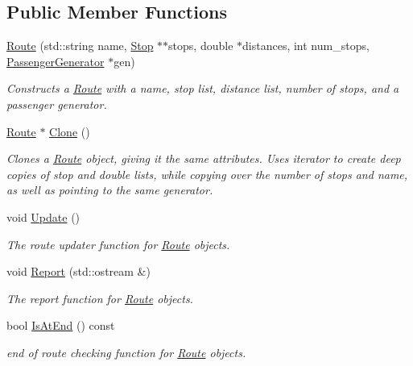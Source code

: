 \subsection*{Public Member Functions}
\begin{DoxyCompactItemize}
\item 
\hyperlink{classRoute_ad1bef6c95f3ca3c2713fba850eee9057}{Route} (std\+::string name, \hyperlink{classStop}{Stop} $\ast$$\ast$stops, double $\ast$distances, int num\+\_\+stops, \hyperlink{classPassengerGenerator}{Passenger\+Generator} $\ast$gen)
\begin{DoxyCompactList}\small\item\em Constructs a \hyperlink{classRoute}{Route} with a name, stop list, distance list, number of stops, and a passenger generator. \end{DoxyCompactList}\item 
\hyperlink{classRoute}{Route} $\ast$ \hyperlink{classRoute_a4031b4a218b1530e28dcf5ee5c6fa8e7}{Clone} ()
\begin{DoxyCompactList}\small\item\em Clones a \hyperlink{classRoute}{Route} object, giving it the same attributes. Uses iterator to create deep copies of stop and double lists, while copying over the number of stops and name, as well as pointing to the same generator. \end{DoxyCompactList}\item 
void \hyperlink{classRoute_a7ecf1d4200f5fe110de4a1d9ea9408c3}{Update} ()
\begin{DoxyCompactList}\small\item\em The route updater function for \hyperlink{classRoute}{Route} objects. \end{DoxyCompactList}\item 
void \hyperlink{classRoute_a6115a741ea15af716c1a624627ec954a}{Report} (std\+::ostream \&)
\begin{DoxyCompactList}\small\item\em The report function for \hyperlink{classRoute}{Route} objects. \end{DoxyCompactList}\item 
bool \hyperlink{classRoute_a529ab995aefd1001b250a6c1ccf77892}{Is\+At\+End} () const
\begin{DoxyCompactList}\small\item\em end of route checking function for \hyperlink{classRoute}{Route} objects. \end{DoxyCompactList}\item 
$$
\end{DoxyCompactItemize}
